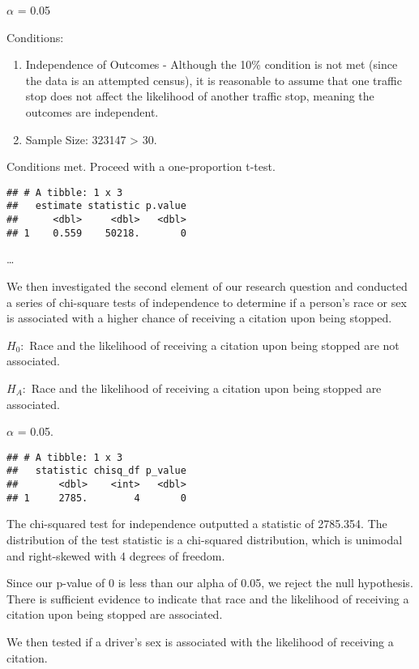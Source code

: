 \documentclass[
]{article}
\begin{document}
\(\alpha\) = 0.05

Conditions:

\begin{enumerate}
\def\labelenumi{\arabic{enumi}.}
\item
  Independence of Outcomes - Although the 10\% condition is not met
  (since the data is an attempted census), it is reasonable to assume
  that one traffic stop does not affect the likelihood of another
  traffic stop, meaning the outcomes are independent.
\item
  Sample Size: 323147 \textgreater{} 30.
\end{enumerate}

Conditions met. Proceed with a one-proportion t-test.

\begin{verbatim}
## # A tibble: 1 x 3
##   estimate statistic p.value
##      <dbl>     <dbl>   <dbl>
## 1    0.559    50218.       0
\end{verbatim}

\ldots{}

We then investigated the second element of our research question and
conducted a series of chi-square tests of independence to determine if a
person's race or sex is associated with a higher chance of receiving a
citation upon being stopped.

\(H_0:\) Race and the likelihood of receiving a citation upon being
stopped are not associated.

\(H_A:\) Race and the likelihood of receiving a citation upon being
stopped are associated.

\(\alpha\) = 0.05.

\begin{verbatim}
## # A tibble: 1 x 3
##   statistic chisq_df p_value
##       <dbl>    <int>   <dbl>
## 1     2785.        4       0
\end{verbatim}

The chi-squared test for independence outputted a statistic of 2785.354.
The distribution of the test statistic is a chi-squared distribution,
which is unimodal and right-skewed with 4 degrees of freedom.

Since our p-value of 0 is less than our alpha of 0.05, we reject the
null hypothesis. There is sufficient evidence to indicate that race and
the likelihood of receiving a citation upon being stopped are
associated.

We then tested if a driver's sex is associated with the likelihood of
receiving a citation.
\end{document}
